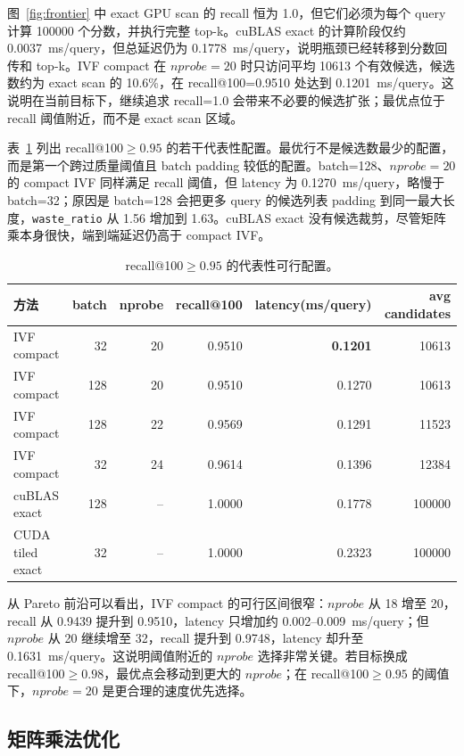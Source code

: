 \documentclass[10pt,a4paper]{article}
\newcommand{\msq}{ms/query}
\begin{document}
图~\ref{fig:frontier} 中 exact GPU scan 的 recall 恒为 1.0，但它们必须为每个 query 计算 100000 个分数，并执行完整 top-k。cuBLAS exact 的计算阶段仅约 0.0037~\msq{}，但总延迟仍为 0.1778~\msq{}，说明瓶颈已经转移到分数回传和 top-k。IVF compact 在 $nprobe=20$ 时只访问平均 10613 个有效候选，候选数约为 exact scan 的 10.6\%，在 recall@100=0.9510 处达到 0.1201~\msq{}。这说明在当前目标下，继续追求 recall=1.0 会带来不必要的候选扩张；最优点位于 recall 阈值附近，而不是 exact scan 区域。

表~\ref{tab:best-feasible} 列出 recall@100$\ge0.95$ 的若干代表性配置。最优行不是候选数最少的配置，而是第一个跨过质量阈值且 batch padding 较低的配置。batch=128、$nprobe=20$ 的 compact IVF 同样满足 recall 阈值，但 latency 为 0.1270~\msq{}，略慢于 batch=32；原因是 batch=128 会把更多 query 的候选列表 padding 到同一最大长度，\texttt{waste\_ratio} 从 1.56 增加到 1.63。cuBLAS exact 没有候选裁剪，尽管矩阵乘本身很快，端到端延迟仍高于 compact IVF。

\begin{table}[H]
\centering
\small
\caption{recall@100$\ge0.95$ 的代表性可行配置。}
\label{tab:best-feasible}
\begin{tabular}{lrrrrr}
\toprule
方法 & batch & nprobe & recall@100 & latency(\msq) & avg candidates \\
\midrule
IVF compact & 32  & 20 & 0.9510 & \textbf{0.1201} & 10613 \\
IVF compact & 128 & 20 & 0.9510 & 0.1270 & 10613 \\
IVF compact & 128 & 22 & 0.9569 & 0.1291 & 11523 \\
IVF compact & 32  & 24 & 0.9614 & 0.1396 & 12384 \\
cuBLAS exact & 128 & -- & 1.0000 & 0.1778 & 100000 \\
CUDA tiled exact & 32 & -- & 1.0000 & 0.2323 & 100000 \\
\bottomrule
\end{tabular}
\end{table}

从 Pareto 前沿可以看出，IVF compact 的可行区间很窄：$nprobe$ 从 18 增至 20，recall 从 0.9439 提升到 0.9510，latency 只增加约 0.002--0.009~\msq{}；但 $nprobe$ 从 20 继续增至 32，recall 提升到 0.9748，latency 却升至 0.1631~\msq{}。这说明阈值附近的 $nprobe$ 选择非常关键。若目标换成 recall@100$\ge0.98$，最优点会移动到更大的 $nprobe$；在 recall@100$\ge0.95$ 的阈值下，$nprobe=20$ 是更合理的速度优先选择。

\subsection{矩阵乘法优化}
\end{document}
